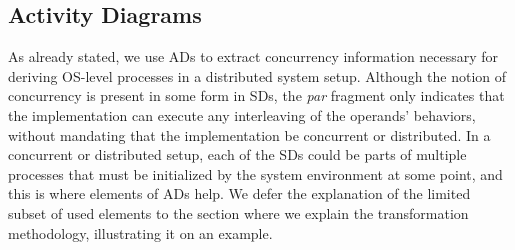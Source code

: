 \documentclass[letter]{llncs}
\newcommand{\subsecshrink}{\vspace{-.5cm}}
\newcommand{\subsecshrinkbegin}{\vspace{-.2cm}}
\begin{document}
\subsection{Activity Diagrams}
\subsecshrinkbegin
As already stated, we use ADs to extract concurrency information necessary for deriving OS-level processes
in a distributed system setup. Although the notion of concurrency is present in some form in SDs, 
the \emph{par} fragment only indicates
that the implementation can execute any interleaving of the operands' behaviors, without mandating that the implementation be concurrent or distributed. 
In a concurrent or distributed setup, each of the SDs could be parts of multiple processes that must be initialized by
the system environment at some point, and this is where elements of ADs help.
We defer the explanation of the limited subset of used elements to the section where we explain the 
transformation methodology, illustrating it on an example.
% 
\subsecshrink
\end{document}
